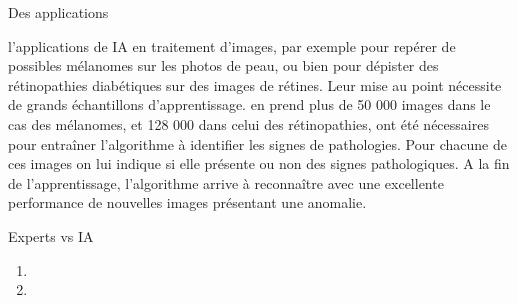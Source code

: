 \begin{frame}{Des applications}
    \begin{enumerate}[<+-|alert@+>]
        \myitem
        l'applications de IA en traitement d'images, par exemple pour repérer de
        possibles mélanomes sur les photos de peau, ou bien pour dépister des
        rétinopathies diabétiques sur des images de rétines. Leur mise au point
        nécessite de grands échantillons d'apprentissage.
        \myitem
        en prend plus de 50 000 images dans le cas des mélanomes, et 128 000
        dans celui des rétinopathies, ont été nécessaires pour entraîner
        l'algorithme à identifier les signes de pathologies. Pour chacune
        de ces images on lui indique si elle présente ou non des signes
        pathologiques.
        \myitem
        A la fin de l'apprentissage, l'algorithme arrive à
        reconnaître avec une excellente performance de nouvelles images
            présentant une anomalie. \mybox
    \end{enumerate}
\end{frame}


\begin{frame}{Experts  vs IA}
    \begin{enumerate}[]
        \item {}

        \item {}
            \vspace{80mm}
    \end{enumerate}
\end{frame}
